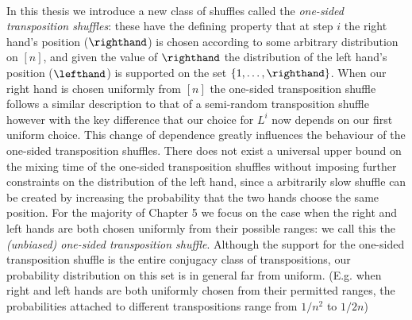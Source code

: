 \documentclass[11pt]{report}
\begin{document}
\paragraph{}
In this thesis we introduce a new class of shuffles called 
the \emph{one-sided transposition shuffles}: these have the defining property 
that at step $i$ the right hand's position ($\righthand$) is chosen 
according to some arbitrary distribution on $[n]$, and given the value of 
$\righthand$ the distribution of the left hand's position ($\lefthand$) is 
supported on the set $\{1,\dots,\righthand\}$.  When our right hand is chosen uniformly from $[n]$ the one-sided transposition shuffle follows a similar description to that of a semi-random transposition shuffle however with the key difference that our choice for $L^{i}$ now depends on our first uniform choice. This change of dependence greatly influences the behaviour of the one-sided transposition shuffles. There does not exist a universal upper bound on the mixing time of the one-sided transposition shuffles without imposing further constraints on the distribution of the left hand, since a arbitrarily slow shuffle can be created by increasing the probability that the two hands choose the same position. For the majority of Chapter 5 we focus on the case when the right and left hands are both chosen uniformly from their possible ranges: we call this the \emph{(unbiased) one-sided transposition shuffle}. Although the support for the one-sided transposition shuffle is the entire conjugacy class of transpositions, our probability distribution on 
this set is in general far from uniform. (E.g. when right and left hands are both uniformly chosen from their permitted ranges, the probabilities attached to  different transpositions range from $1/n^2$ to $1/2n$)
\end{document}

